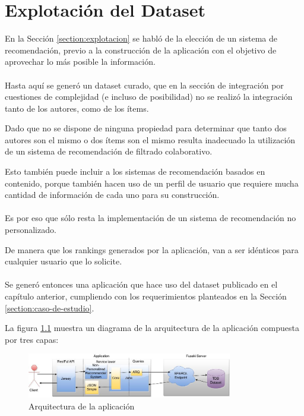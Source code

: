 \chapter{Explotación del Dataset}
\label{chapter:explotacion}

En la Sección \ref{section:explotacion} se habló de la elección de un sistema de recomendación, previo 
a la construcción de la aplicación con el objetivo de aprovechar lo más posible la información.\\
\\
Hasta aquí se generó un dataset curado, que en la sección de integración por cuestiones de complejidad 
(e incluso de posibilidad) no se realizó la integración tanto de los autores, como de los ítems.

Dado que no se dispone de ninguna propiedad para determinar que tanto dos autores son el mismo o dos ítems son el mismo 
resulta inadecuado la utilización de un sistema de recomendación de filtrado colaborativo.

Esto también puede incluir a los sistemas de recomendación basados en contenido, porque también hacen uso de 
un perfil de usuario que requiere mucha cantidad de información de cada uno para su construcción.
\\\\
Es por eso que sólo resta la implementación de un sistema de recomendación no personalizado.

De manera que los rankings generados por la aplicación, van a ser idénticos para cualquier 
usuario que lo solicite.
\\\\
Se generó entonces una aplicación que hace uso del dataset publicado en el capítulo anterior, 
cumpliendo con los requerimientos planteados en la Sección \ref{section:caso-de-estudio}.

La figura \ref{figure:explotacion} muestra un diagrama de la arquitectura de la aplicación compuesta por tres capas:

\begin{figure}
    \centering
    \includegraphics[width=0.8\textwidth,natwidth=610,natheight=642]{explotacion}
    \caption{Arquitectura de la aplicación}
    \label{figure:explotacion}
\end{figure}

